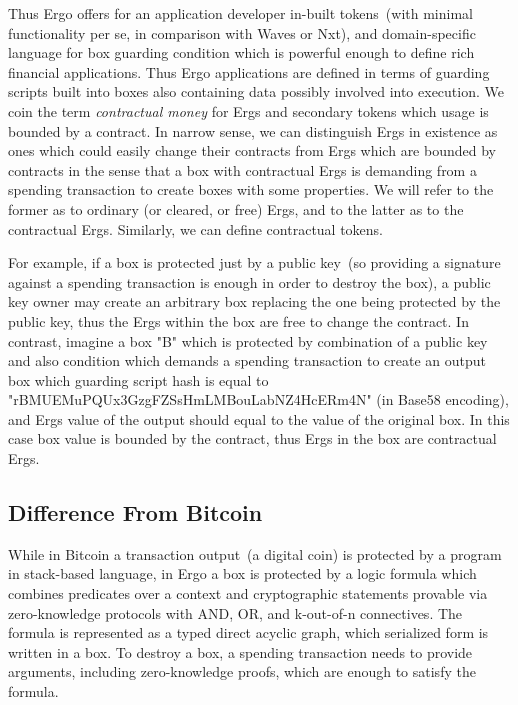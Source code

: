  Thus Ergo offers for an application developer in-built tokens~(with minimal functionality per se, in comparison with
 Waves or Nxt), and domain-specific language for box guarding condition which is powerful enough to define rich
 financial applications. Thus Ergo applications are defined in terms of guarding scripts built into boxes also containing
 data possibly involved into execution. We coin the term {\em contractual money} for Ergs and secondary tokens which
 usage is bounded by a contract. In narrow sense, we can distinguish Ergs in existence as ones which could easily
 change their contracts from Ergs which are bounded by contracts in the sense that a box with contractual Ergs is
 demanding from a spending transaction to create boxes with some properties. We will refer to the former as to ordinary
 (or cleared, or free) Ergs, and to the latter as to the contractual Ergs. Similarly, we can define contractual tokens.

 For example, if a box is protected just by a public key~(so providing a signature against a spending transaction is
 enough in order to destroy the box), a public key owner may create an arbitrary box replacing the one being protected
 by the public key, thus the Ergs within the box are free to change the contract. In contrast, imagine a box "B" which
 is protected by combination of a public key and also condition which demands a spending transaction to create an output
 box which guarding script hash is equal to "rBMUEMuPQUx3GzgFZSsHmLMBouLabNZ4HcERm4N" (in Base58 encoding), and Ergs
 value of the output should equal to the value of the original box. In this case box value is bounded by the contract,
 thus Ergs in the box are contractual Ergs.

\subsection{Difference From Bitcoin}

 While in Bitcoin a transaction output~(a digital coin) is protected by a program in stack-based language, in Ergo a
 box is protected by a logic formula which combines predicates over a context and cryptographic statements provable
 via zero-knowledge protocols with AND, OR, and k-out-of-n connectives. The formula is represented as a typed direct
 acyclic graph, which serialized form is written in a box. To destroy a box, a spending transaction needs to provide
 arguments, including zero-knowledge proofs, which are enough to satisfy the formula.

